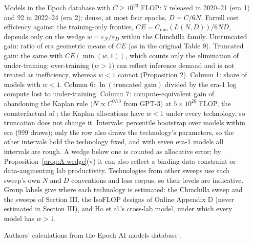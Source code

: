\begin{table}[tp]
\begin{tablenotes}
Models in the Epoch database with $C\geq10^{23}$ FLOP: 7 released in 2020--21 (era 1) and 92 in 2022--24 (era 2); dense, at most four epochs, $D=C/6N$. Farrell cost efficiency against the training-only frontier, $CE=C_{\min}(L(N,D))/6ND$, depends only on the wedge $w=\varepsilon_N/\varepsilon_D$ within the Chinchilla family. Untruncated gain: ratio of era geometric means of $CE$ (as in the original Table 9). Truncated gain: the same with $CE(\min(w,1))$, which counts only the elimination of under-training: over-training ($w>1$) can reflect inference demand and is not treated as inefficiency, whereas $w<1$ cannot (Proposition 2). Column 1: share of models with $w<1$. Column 6: $\ln(\text{truncated gain})$ divided by the era-1 log compute lost to under-training. Column 7: compute-equivalent gain of abandoning the Kaplan rule ($N\propto C^{0.73}$ from GPT-3) at $5\times10^{26}$ FLOP, the counterfactual of \citet{gundlach2025origin}; the Kaplan allocations have $w<1$ under every technology, so truncation does not change it. Intervals: percentile bootstrap over models within era (999 draws); only the \citet{besiroglu2024chinchilla} row also draws the technology's parameters, so the other intervals hold the technology fixed, and with seven era-1 models all intervals are rough. A wedge below one is counted as allocative error; by Proposition~\ref{prop:A-wedge}(v) it can also reflect a binding data constraint or data-augmenting lab productivity. Technologies from other sweeps use each sweep's own $N$ and $D$ conventions and loss corpus, so their levels are indicative. Group labels give where each technology is estimated: the Chinchilla sweep and the sweeps of Section III, the IsoFLOP designs of Online Appendix D (never estimated in Section III), and Ho et al.'s cross-lab model, under which every model has $w>1$.
\end{tablenotes}
\begin{tablenotes}[Source]
Authors' calculations from the Epoch AI models database \citep{epochai2026data}.
\end{tablenotes}
\end{table}
